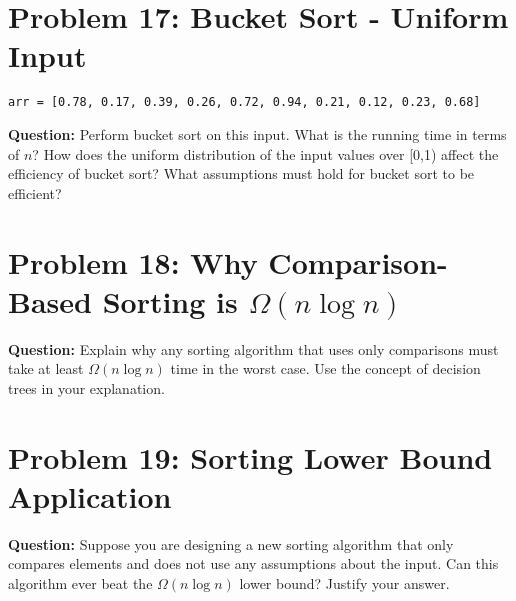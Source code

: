 \documentclass[12pt]{article}
\begin{document}
\vspace{2em}

\section*{Problem 17: Bucket Sort - Uniform Input}
\begin{verbatim}
arr = [0.78, 0.17, 0.39, 0.26, 0.72, 0.94, 0.21, 0.12, 0.23, 0.68]
\end{verbatim}
\textbf{Question:} Perform bucket sort on this input. What is the running time in terms of $n$? How does the uniform distribution of the input values over [0,1) affect the efficiency of bucket sort? What assumptions must hold for bucket sort to be efficient?

\vspace{2em}


\section*{Problem 18: Why Comparison-Based Sorting is $\Omega(n \log n)$}
\textbf{Question:} Explain why any sorting algorithm that uses only comparisons must take at least $\Omega(n \log n)$ time in the worst case. Use the concept of decision trees in your explanation.

\vspace{2em}

\section*{Problem 19: Sorting Lower Bound Application}
\textbf{Question:} Suppose you are designing a new sorting algorithm that only compares elements and does not use any assumptions about the input. Can this algorithm ever beat the $\Omega(n \log n)$ lower bound? Justify your answer.
\end{document}
